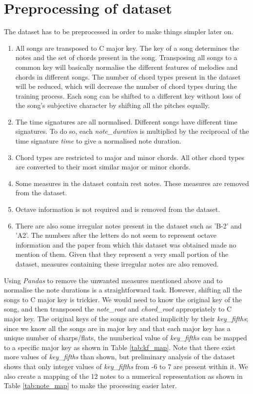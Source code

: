 \section{Preprocessing of dataset}

The dataset has to be preprocessed in order to make things simpler later on.

\begin{enumerate}
  \item All songs are transposed to C major key. The key of a song determines the notes and the set of chords present in the song. Transposing all songs to a common key will basically normalise the different features of melodies and chords in different songs. The number of chord types present in the dataset will be reduced, which will decrease the number of chord types during the training process. Each song can be shifted to a different key without loss of the song's subjective character by shifting all the pitches equally.
  \item The time signatures are all normalised. Different songs have different time signatures. To do so, each \emph{note\_duration} is multiplied by the reciprocal of the time signature \emph{time} to give a normalised note duration.
  \item Chord types are restricted to major and minor chords. All other chord types are converted to their most similar major or minor chords.
  \item Some measures in the dataset contain rest notes. These measures are removed from the dataset.
  \item Octave information is not required and is removed from the dataset.
  \item There are also some irregular notes present in the dataset such as 'B-2' and 'A2'. The numbers after the letters do not seem to represent octave information and the paper from which this dataset was obtained made no mention of them. Given that they represent a very small portion of the dataset, measures containing these irregular notes are also removed.
\end{enumerate}

Using \emph{Pandas} to remove the unwanted measures mentioned above and to normalise the note durations is a straightforward task. However, shifting all the songs to C major key is trickier. We would need to know the original key of the song, and then transposed the \emph{note\_root} and \emph{chord\_root} appropriately to C major key. The original keys of the songs are stated implicitly by their \emph{key\_fifths}; since we know all the songs are in major key and that each major key has a unique number of sharps/flats, the numberical value of \emph{key\_fifths} can be mapped to a specific major key as shown in Table \ref{tab:kf_map}. Note that there exist more values of \emph{key\_fifths} than shown, but preliminary analysis of the dataset shows that only integer values of \emph{key\_fifths} from -6 to 7 are present within it. We also create a mapping of the 12 notes to a numerical representation as shown in Table \ref{tab:note_map} to make the processing easier later.


